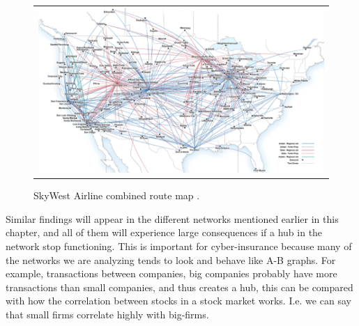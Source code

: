 \begin{figure}[h]
\centering
\begin{tabular}{@{}c@{}}
\includegraphics[width=1.0\textwidth]{../Figures/airlineRoutesUSA.png}
\end{tabular}
\caption[Caption for LOF]{SkyWest Airline combined route map \cite{airlineRoutes}.
\label{fig:airlineRouteMap}}
\end{figure}

Similar findings will appear in the different networks mentioned earlier in this chapter, and all of them will experience large consequences if a hub in the network stop functioning. This is important for cyber-insurance because many of the networks we are analyzing tends to look and behave like A-B graphs. For example, transactions between companies, big companies probably have more transactions than small companies, and thus creates a hub, this can be compared with how the correlation between stocks in a stock market works. I.e. we can say that small firms correlate highly with big-firms. 








